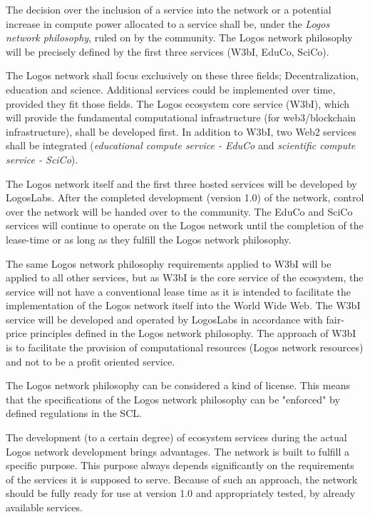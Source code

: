 \documentclass[]{article}
\begin{document}
The decision over the inclusion of a service into the network or a potential increase in compute power allocated to a service shall be, under the \textit{Logos network philosophy}, ruled on by the community.
The Logos network philosophy will be precisely defined by the first three services (W3bI, EduCo, SciCo).

The Logos network shall focus exclusively on these three fields; Decentralization, education and science.
Additional services could be implemented over time, provided they fit those fields.
The Logos ecosystem core service (W3bI), which will provide the fundamental computational infrastructure (for web3/blockchain infrastructure), shall be developed first. 
In addition to W3bI, two Web2 services shall be integrated (\textit{educational compute service - EduCo} and \textit{scientific compute service - SciCo}).   

The Logos network itself and the first three hosted services will be developed by LogosLabs. 
After the completed development (version 1.0) of the network, control over the network will be handed over to the community. 
The EduCo and SciCo services will continue to operate on the Logos network until the completion of the lease-time or as long as they fulfill the Logos network philosophy.

The same Logos network philosophy requirements applied to W3bI will be applied to all other services, but as W3bI is the core service of the ecosystem, the service will not have a conventional lease time as it is intended to facilitate the implementation of the Logos network itself into the World Wide Web.
The W3bI service will be developed and operated by LogosLabs in accordance with fair-price principles defined in the Logos network philosophy.
The approach of W3bI is to facilitate the provision of computational resources (Logos network resources) and not to be a profit oriented service.

The Logos network philosophy can be considered a kind of license.
This means that the specifications of the Logos network philosophy can be "enforced" by defined regulations in the SCL.

The development (to a certain degree) of ecosystem services during the actual Logos network development brings advantages.
The network is built to fulfill a specific purpose. This purpose always depends significantly on the requirements of the services it is supposed to serve.
Because of such an approach, the network should be fully ready for use at version 1.0 and appropriately tested, by already available services.
\end{document}
